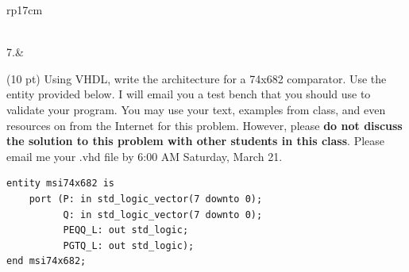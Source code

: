 \documentclass{article}
\begin{document}
\begin{longtable}[l]{rp{17cm}}
\begin{minipage}[t]{\linewidth}
\vspace{14cm
}
\end{minipage}\\
\medskip
7.&\begin{minipage}[t]{\linewidth}(10 pt) Using VHDL, write the architecture for a 74x682 comparator.  Use the entity provided below.  I will email you a test bench that you should use to validate your program.  You may use your text, examples from class, and even resources on from the Internet for this problem.  However, please \textbf{do not discuss the solution to this problem with other students in this class}.  Please email me your .vhd file by 6:00 AM Saturday, March 21.
\lstset{language=VHDL}
\begin{lstlisting}
entity msi74x682 is
    port (P: in std_logic_vector(7 downto 0);
          Q: in std_logic_vector(7 downto 0);
          PEQQ_L: out std_logic;
          PGTQ_L: out std_logic);
end msi74x682;
\end{lstlisting}

\vspace{2cm
}
\end{minipage}\\
\medskip
\end{longtable}
\end{document}
